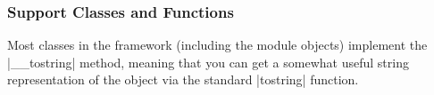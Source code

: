 \subsubsection{Support Classes and Functions}

Most classes in the framework (including the module objects) implement
the |__tostring| method, meaning that you can get a somewhat useful
string representation of the object via the standard |tostring|
function.

%
%
%


